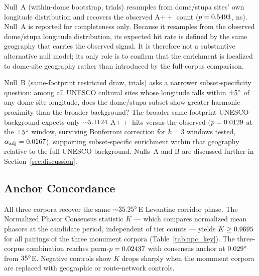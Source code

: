 \documentclass[12pt,a4paper]{article}
\newcommand{\degr}{\ifmmode^\circ\else\textdegree{}\fi}
\begin{document}
Null~A (within-dome bootstrap, \simNperms{} trials) resamples from
dome/stupa sites' own longitude distribution and recovers the observed
A$++$ count ($p = 0.5493{}$, ns). Null~A is reported for
completeness only. Because it resamples from the observed dome/stupa
longitude distribution, its expected hit rate is defined by the same
geography that carries the observed signal. It is therefore not a
substantive alternative null model; its only role is to confirm that
the enrichment is localized to dome-site geography rather than
introduced by the full-corpus comparison.

Null~B (same-footprint restricted draw, \simNperms{} trials) asks a
narrower subset-specificity question: among all UNESCO cultural sites
whose longitude falls within ${\pm}5\degr$ of any dome site longitude,
does the dome/stupa subset show greater harmonic proximity than the
broader background? The broader same-footprint UNESCO background
expects only ${\sim}5.1124{}$ A$++$ hits versus the
observed \NcircTierApp{} ($p = 0.0129{}$ at the
${\pm}5\degr$ window, surviving Bonferroni correction for $k = 3$
windows tested, $\alpha_\mathrm{adj} = 0.0167{}$), supporting
subset-specific enrichment within that geography relative to the full UNESCO
background.
Nulls~A and B are discussed further in Section~\ref{sec:discussion}.

\subsection{Anchor Concordance}

All three corpora recover the same ${\sim}35.25\degr$E Levantine
corridor phase. The Normalized Phasor Consensus statistic $K$ ---
which compares normalized mean phasors at the candidate period,
independent of tier counts ---
yields $K \geq 0.9695{}$ for all pairings of the three monument
corpora (Table~\ref{tab:npc_key}). The three-corpus combination reaches
perm-$p = 0.02437{}$ with consensus anchor at
$\npcOsmThreeGridDeltaE\degr$ from $35\degr$E. Negative controls show
$K$ drops sharply when the monument corpora are replaced with
geographic or route-network controls.
\end{document}
